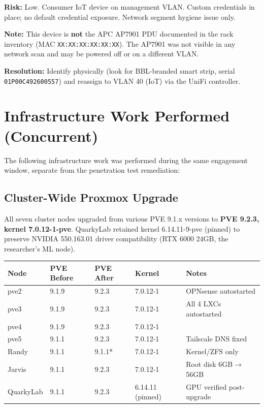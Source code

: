 \documentclass[11pt,a4paper]{article}
\begin{document}
\textbf{Risk:} Low. Consumer IoT device on management VLAN. Custom credentials in place;
no default credential exposure. Network segment hygiene issue only.

\textbf{Note:} This device is \textbf{not} the APC AP7901 PDU documented in the rack
inventory (MAC \texttt{XX:XX:XX:XX:XX:XX}). The AP7901 was not visible in any network scan
and may be powered off or on a different VLAN.

\textbf{Resolution:} Identify physically (look for BBL-branded smart strip, serial
\texttt{01P00C492600557}) and reassign to VLAN 40 (IoT) via the UniFi controller.

\section{Infrastructure Work Performed (Concurrent)}

The following infrastructure work was performed during the same engagement window, separate
from the penetration test remediation:

\subsection{Cluster-Wide Proxmox Upgrade}

All seven cluster nodes upgraded from various PVE 9.1.x versions to \textbf{PVE 9.2.3,
kernel 7.0.12-1-pve}. QuarkyLab retained kernel 6.14.11-9-pve (pinned) to preserve NVIDIA
550.163.01 driver compatibility (RTX 6000 24GB, the researcher's ML node).

\begin{longtable}{@{}lllll@{}}
\toprule
\textbf{Node} & \textbf{PVE Before} & \textbf{PVE After} & \textbf{Kernel} & \textbf{Notes} \\
\midrule
\endhead
pve2 & 9.1.9 & 9.2.3 & 7.0.12-1 & OPNsense autostarted \\
pve3 & 9.1.9 & 9.2.3 & 7.0.12-1 & All 4 LXCs autostarted \\
pve4 & 9.1.9 & 9.2.3 & 7.0.12-1 & \\
pve5 & 9.1.1 & 9.2.3 & 7.0.12-1 & Tailscale DNS fixed \\
Randy & 9.1.1 & 9.1.1* & 7.0.12-1 & Kernel/ZFS only \\
Jarvis & 9.1.1 & 9.2.3 & 7.0.12-1 & Root disk 6GB$\to$56GB \\
QuarkyLab & 9.1.1 & 9.2.3 & 6.14.11 (pinned) & GPU verified post-upgrade \\
\bottomrule
\end{longtable}
\end{document}
